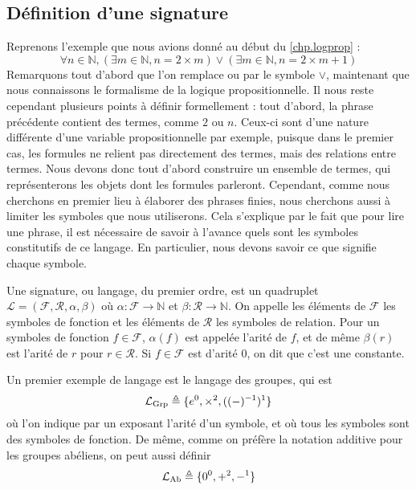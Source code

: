 \subsection{Définition d'une signature}

Reprenons l'exemple que nous avions donné au début du \cref{chp.logprop} :
\[\forall n \in \mathbb N, (\exists m \in \mathbb N, n = 2\times m) \lor
(\exists m \in \mathbb N, n = 2 \times m + 1)\]
Remarquons tout d'abord que l'on remplace \og ou\fg{} par le symbole $\lor$,
maintenant que nous connaissons le formalisme de la logique propositionnelle.
Il nous reste cependant plusieurs points à définir formellement : tout d'abord,
la phrase précédente contient des termes, comme $2$ ou $n$. Ceux-ci sont d'une
nature différente d'une variable propositionnelle par exemple, puisque dans le
premier cas, les formules ne relient pas directement des termes, mais des
relations entre termes. Nous devons donc tout d'abord construire un ensemble de
termes, qui représenterons les objets dont les formules parleront. Cependant,
comme nous cherchons en premier lieu à élaborer des phrases finies, nous
cherchons aussi à limiter les symboles que nous utiliserons. Cela s'explique par
le fait que pour lire une phrase, il est nécessaire de savoir à l'avance quels
sont les symboles constitutifs de ce langage. En particulier, nous devons savoir
ce que signifie chaque symbole.

\begin{definition}[Signature]
  Une signature, ou langage, du premier ordre, est un quadruplet $\mathcal L =
  (\mathcal F,\mathcal R, \alpha,\beta)$ où $\alpha : \mathcal F \to \mathbb N$
  et $\beta : \mathcal R \to \mathbb N$. On appelle les éléments de $\mathcal F$
  les symboles de fonction et les éléments de $\mathcal R$ les symboles de
  relation. Pour un symboles de fonction $f\in\mathcal F$, $\alpha(f)$ est
  appelée l'arité de $f$, et de même $\beta(r)$ est l'arité de $r$ pour
  $r\in\mathcal R$. Si $f\in\mathcal F$ est d'arité $0$, on dit que c'est une
  constante.
\end{definition}

\begin{example}
  Un premier exemple de langage est le langage des groupes, qui est
  \[\mathcal L_{\mathrm{Grp}} \triangleq \{e^0,\times^2,((-)^{-1})^1\}\]
  où l'on indique par un exposant l'arité d'un symbole, et où tous les symboles
  sont des symboles de fonction. De même, comme on préfère la notation additive
  pour les groupes abéliens, on peut aussi définir
  \[\mathcal L_{\mathrm{Ab}} \triangleq \{0^0,+^2,-^1\}\]
\end{example}

